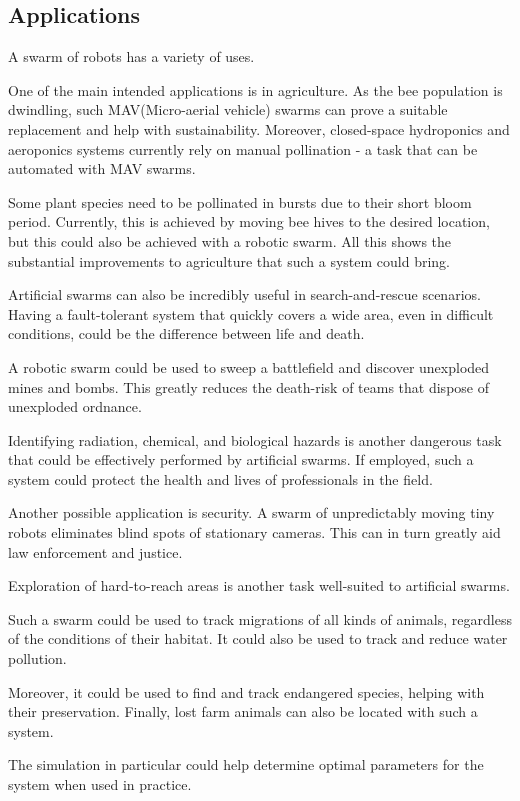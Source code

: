 \documentclass[a4paper, 12pt, times]{article}
\begin{document}
\begin{multicols}{2}
\section{Applications}
\label{subsec:applications}
A swarm of robots has a variety of uses.
\par One of the main intended applications is in agriculture. As the bee population is dwindling, such MAV(Micro-aerial vehicle) swarms can prove a suitable replacement and help with sustainability. Moreover, closed-space hydroponics and aeroponics systems currently rely on manual pollination - a task that can be automated with MAV swarms. 
\par Some plant species need to be pollinated in bursts due to their short bloom period. Currently, this is achieved by moving bee hives to the desired location, but this could also be achieved with a robotic swarm. All this shows the substantial improvements to agriculture that such a system could bring.
\par Artificial swarms can also be incredibly useful in search-and-rescue scenarios. Having a fault-tolerant system that quickly covers a wide area, even in difficult conditions, could be the difference between life and death.   
\par A robotic swarm could be used to sweep a battlefield and discover unexploded mines and bombs. This greatly reduces the death-risk of teams that dispose of unexploded ordnance.
\par Identifying radiation, chemical, and biological hazards is another dangerous task that could be effectively performed by artificial swarms. If employed, such a system could protect the health and lives of professionals in the field. 
\par Another possible application is security. A swarm of unpredictably moving tiny robots eliminates blind spots of stationary cameras. This can in turn greatly aid law enforcement and justice. 
\par Exploration of hard-to-reach areas is another task well-suited to artificial swarms.
\par Such a swarm could be used to track migrations of all kinds of animals, regardless of the conditions of their habitat. It could also be used to track and reduce water pollution.
\par Moreover, it could be used to find and track endangered species, helping with their preservation. Finally, lost farm animals can also be located with such a system. 
\par The simulation in particular could help determine optimal parameters for the system when used in practice.  

\end{multicols}
\end{document}
